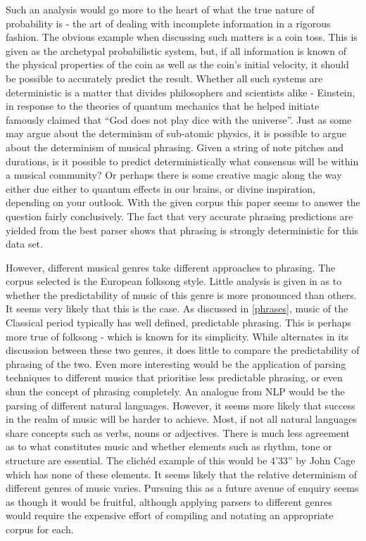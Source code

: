 \documentclass[a4paper,12pt]{article}
\begin{document}
Such an analysis would go more to the heart of what the true nature of probability is - the art of dealing with incomplete information in a  rigorous fashion. The obvious example when discussing such matters is a coin toss. This is given as the archetypal probabilistic system, but, if all information is known of the physical properties of the coin as well as the coin's initial velocity, it should be possible to accurately predict the result. Whether all such systems are deterministic is a matter that divides philosophers and scientists alike - Einstein, in response to the theories of quantum mechanics that he helped initiate famously claimed that ``God does not play dice with the universe''. Just as some may argue about the determinism of sub-atomic physics, it is possible to argue about the determinism of musical phrasing. Given a string of note pitches and durations, is it possible to predict deterministically what consensus will be within a musical community? Or perhaps there is some creative magic along the way either due either to quantum effects in our brains, or divine inspiration, depending on your outlook. With the given corpus this paper seems to answer the question fairly conclusively. The fact that very accurate phrasing predictions are yielded from the best parser shows that phrasing is strongly deterministic for this data set.

However,  different musical genres take different approaches to phrasing. The corpus selected is the European folksong style. Little analysis is given in \cite{Bod_probabilisticgrammars} as to whether the predictability of music of this genre is more pronounced than others. It seems very likely that this is the case. As discussed in \ref{phrases}, music of the Classical period typically has well defined, predictable phrasing. This is perhaps more true of folksong - which is known for its simplicity. While \cite{Bod_probabilisticgrammars} alternates in its discussion between these two genres, it does little to compare the predictability of phrasing of the two. Even more interesting would be the application of parsing techniques to different musics that prioritise less predictable phrasing, or even shun the concept of phrasing completely. An analogue from NLP would be the parsing of different natural languages. However, it seems more likely that success in the realm of music will be harder to achieve. Most, if not all natural languages share concepts such as verbs, nouns or adjectives. There is much less agreement as to what constitutes music and whether elements such as rhythm, tone or structure are essential. The clich\'ed example of this would be 4'33'' by John Cage which has none of these elements. It seems likely that the relative determinism of different genres of music varies. Pursuing this as a future avenue of enquiry seems as though it would be fruitful, although applying parsers to different genres would require the expensive effort of compiling and notating an appropriate corpus for each.
\end{document}
